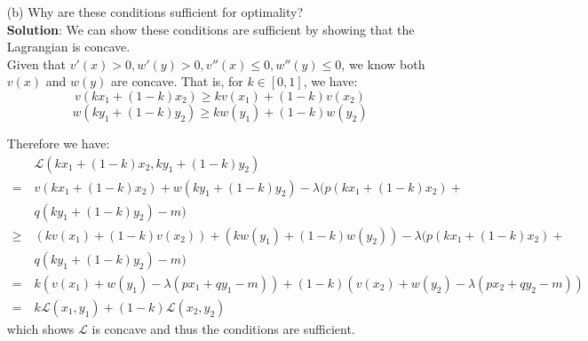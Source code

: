 \documentclass{article}
\begin{document}
\begin{enumerate}
\begin{enumerate}
            \item[(b)] Why are these conditions sufficient for optimality? \\
            
            \textbf{Solution}: We can show these conditions are sufficient by showing that the Lagrangian is concave. \\
            
            Given that $v'(x)>0,w'(y)>0,v''(x)\leq 0,w''(y)\leq 0$, we know both $v(x)$ and $w(y)$ are concave. That is, for $k \in [0,1]$, we have:
            $$ v(kx_1 + (1-k)x_2) \geq kv(x_1) + (1-k)v(x_2) $$
            $$ w(ky_1 + (1-k)y_2) \geq kw(y_1) + (1-k)w(y_2) $$
            
            Therefore we have:
            \begin{align*}
                       \ & \mathcal{L}( kx_1 + (1-k)x_2, ky_1 + (1-k)y_2 ) 
                \\    =\ & v(kx_1 + (1-k)x_2) + w(ky_1 + (1-k)y_2) - \lambda(p(kx_1 + (1-k)x_2) + 
                \\       & q(ky_1 + (1-k)y_2) - m)
                \\ \geq\ & (kv(x_1) + (1-k)v(x_2)) + (kw(y_1) + (1-k)w(y_2)) - \lambda(p(kx_1 + (1-k)x_2) + 
                \\       & q(ky_1 + (1-k)y_2) - m)
                \\    =\ & k( v(x_1)+w(y_1)-\lambda(px_1+qy_1-m) ) + (1-k)( v(x_2)+w(y_2) - \lambda(px_2+qy_2-m) )
                \\    =\ & k\mathcal{L}(x_1,y_1) + (1-k)\mathcal{L}(x_2,y_2)
            \end{align*}
            which shows $\mathcal{L}$ is concave and thus the conditions are sufficient.
        \end{enumerate}

\end{enumerate}
\end{document}
